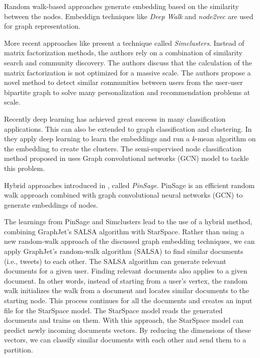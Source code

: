 Random walk-based approaches generate embedding based on the similarity between the nodes. Embeddign techniques like \emph{Deep Walk} \cite{perozziDeepWalkOnlineLearning2014} and \emph{node2vec} \cite{groverNode2vecScalableFeature2016} are used for graph representation.


More recent approaches like \cite{satuluriSimClustersCommunityBasedRepresentations2020a} present a technique called \emph{Simclusters}. Instead of matrix factorization methods, the authors rely on a combination of similarity search and community discovery. The authors discuss that the calculation of the matrix factorization is not optimized for a massive scale. The authors propose a novel method to detect similar communities between users from the user-user bipartite graph to solve many personalization and recommendation problems at scale.


Recently deep learning has achieved great success in many classification applications. This can also be extended to graph classification and clustering. In \cite{tianLearningDeepRepresentations2014} they apply deep learning to learn the embeddings and run a \emph{k}-mean algorithm on the embedding to create the clusters. The semi-supervised node classification method proposed in \cite{kipfSemiSupervisedClassificationGraph2017} uses Graph convolutional networks (GCN) model to tackle this problem. 

Hybrid approaches introduced in \cite{yingGraphConvolutionalNeural2018}, called \emph{PinSage}. PinSage is an efficient random walk approach combined with graph convolutional neural networks (GCN) to generate embeddings of nodes.


The learnings from PinSage and Simclusters lead to the use of a hybrid method, combining GraphJet's SALSA algorithm with StarSpace. Rather than using a new random-walk approach of the discussed graph embedding techniques, we can apply GraphJet's random-walk algorithm (SALSA) to find similar documents (i.e., tweets) to each other. The SALSA algorithm can generate relevant documents for a given user. Finding relevant documents also applies to a given document. In other words, instead of starting from a user's vertex, the random walk initializes the walk from a document and locates similar documents to the starting node. This process continues for all the documents and creates an input file for the StarSpace model. The StarSpace model reads the generated documents and trains on them. With this approach, the StarSpace model can predict newly incoming documents vectors. By reducing the dimensions of these vectors, we can classify similar documents with each other and send them to a partition. 
